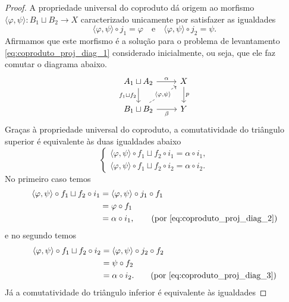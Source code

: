 \begin{proof}
  A propriedade universal do coproduto dá origem ao morfismo $\langle \varphi,\psi \rangle: B_1 \sqcup B_2 \to X$ caracterizado unicamente por satisfazer as igualdades
  \begin{displaymath}
    \langle \varphi,\psi \rangle \circ j_1 = \varphi \quad \text{e} \quad \langle \varphi,\psi \rangle \circ j_2 = \psi.
  \end{displaymath}
  Afirmamos que este morfismo é a solução para o problema de levantamento \eqref{eq:coproduto_proj_diag_1} considerado inicialmente, ou seja, que ele faz comutar o diagrama abaixo.
  \begin{displaymath}
    \begin{tikzcd}
      A_1 \sqcup A_2
      \arrow[r, "\alpha"]
      \arrow[d, "f_1 \sqcup f_2" swap]
      & X
      \arrow[d, "p"]
      \\ B_1 \sqcup B_2
      \arrow[r, "\beta" swap]
      \arrow[ru, dashed, "{\langle \varphi,\psi \rangle}" description]
      & Y
    \end{tikzcd}
  \end{displaymath}
  Graças à propriedade universal do coproduto, a comutatividade do triângulo superior é equivalente às duas igualdades abaixo
  \begin{displaymath}
    \begin{cases}
      \langle \varphi,\psi \rangle \circ f_1 \sqcup f_2 \circ i_1 = \alpha \circ i_1, \\
      \langle \varphi,\psi \rangle \circ f_1 \sqcup f_2 \circ i_2 = \alpha \circ i_2.
    \end{cases}
  \end{displaymath}
  No primeiro caso temos
  \begin{align*}
    \langle \varphi,\psi \rangle \circ f_1 \sqcup f_2 \circ i_1
    & = \langle \varphi,\psi \rangle \circ j_1 \circ f_1 \\
    & = \varphi \circ f_1 \\
    & = \alpha \circ i_1,
    \tag{por \eqref{eq:coproduto_proj_diag_2}}
  \end{align*}
  e no segundo temos
  \begin{align*}
    \langle \varphi,\psi \rangle \circ f_1 \sqcup f_2 \circ i_2
    & = \langle \varphi,\psi \rangle \circ j_2 \circ f_2 \\
    & = \psi \circ f_2 \\
    & = \alpha \circ i_2.
    \tag{por \eqref{eq:coproduto_proj_diag_3}}
  \end{align*}
  Já a comutatividade do triângulo inferior é equivalente às igualdades

\end{proof}
